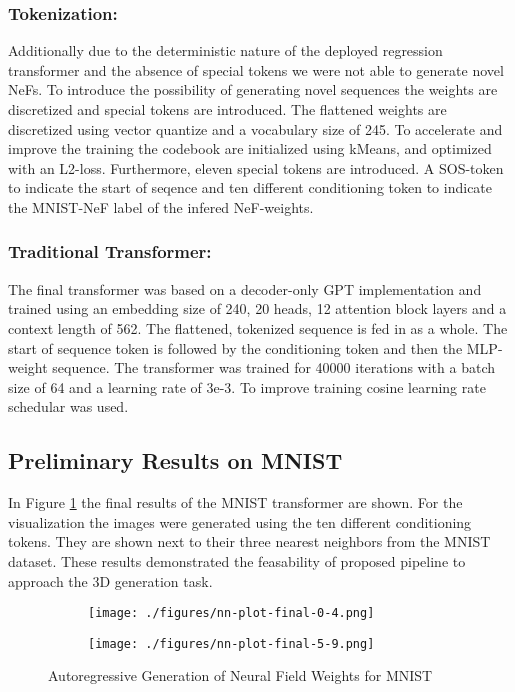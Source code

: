 \subsubsection*{Tokenization: }
Additionally due to the deterministic nature of the deployed regression transformer and the absence of special tokens we were not able to generate novel NeFs. To introduce the possibility of generating novel sequences the weights are discretized and special tokens are introduced. The flattened weights are discretized using vector quantize and a vocabulary size of 245. To accelerate and improve the training the codebook are initialized using kMeans, and optimized with an L2-loss. Furthermore, eleven special tokens are introduced. A SOS-token to indicate the start of seqence and ten different conditioning token to indicate the MNIST-NeF label of the infered NeF-weights.

\subsubsection*{Traditional Transformer: }
The final transformer was based on a decoder-only GPT implementation \cite{Karpathy2022} and trained using an embedding size of 240, 20 heads, 12 attention block layers and a context length of 562. The flattened, tokenized sequence is fed in as a whole. The start of sequence token is followed by the conditioning token and then the MLP-weight sequence. The transformer was trained for 40000 iterations with a batch size of 64 and a learning rate of 3e-3. To improve training cosine learning rate schedular was used. 



\subsection{Preliminary Results on MNIST}
In Figure \ref{fig:mnist} the final results of the MNIST transformer are shown. For the visualization the images were generated using the ten different conditioning tokens. They are shown next to their three nearest neighbors from the MNIST dataset. These results demonstrated the feasability of proposed pipeline to approach the 3D generation task.

\begin{figure}[H]
  \begin{mdframed}[backgroundcolor=mnistbg]

    \centering
    \begin{subfigure}{.5\linewidth}
      \centering
      \texttt{[image: ./figures/nn-plot-final-0-4.png]}
    \end{subfigure}%
    \begin{subfigure}{.5\linewidth}
      \centering
      \texttt{[image: ./figures/nn-plot-final-5-9.png]}
    \end{subfigure}

  \end{mdframed}
  \caption{\label{fig:mnist} Autoregressive Generation of Neural Field Weights for MNIST}
\end{figure}


